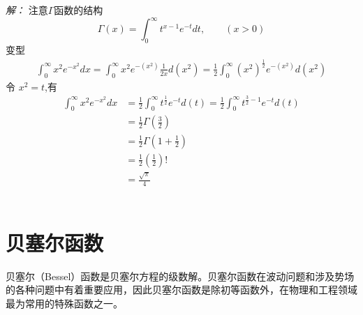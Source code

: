 	\emph{解：}
	注意$\Gamma$函数的结构
		\[\Gamma(x)=\int_{0}^{\infty} t^{x-1} e^{-t} dt, \qquad (x>0)\]
		变型
		\[\begin{aligned}
			\int_{0}^{\infty} x^2 e^{-x^2} dx = \int_{0}^{\infty} x^2 e^{-(x^2)} \frac{1}{2x}d(x^2)
			= \frac{1}{2}\int_{0}^{\infty} (x^2)^{\frac{1}{2}} e^{-(x^2)} d(x^2)
		\end{aligned} \]
	令 $x^2 =t$,有 
		  \[\begin{aligned}
			\int_{0}^{\infty} x^2 e^{-x^2} dx  &= \frac{1}{2}\int_{0}^{\infty} t^{\frac{1}{2}} e^{-t} d(t) = \frac{1}{2}\int_{0}^{\infty} t^{\frac{3}{2}-1} e^{-t} d(t) \\	
			&= \frac{1}{2}\Gamma(\frac{3}{2})  \\ 
			&= \frac{1}{2} \Gamma(1+\frac{1}{2}) \\
			&= \frac{1}{2} (\frac{1}{2})!	\\
			&= \frac{\sqrt{\pi}}{4}
		\end{aligned} \]
	~~\\
	


\section{贝塞尔函数}
贝塞尔（Bessel）函数是贝塞尔方程的级数解。贝塞尔函数在波动问题和涉及势场的各种问题中有着重要应用，因此贝塞尔函数是除初等函数外，在物理和工程领域最为常用的特殊函数之一。

